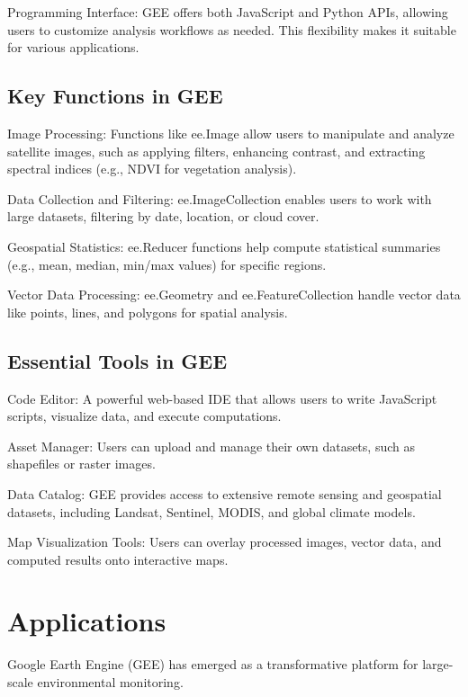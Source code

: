 \documentclass[
  letterpaper,
]{scrbook}
\begin{document}
Programming Interface: GEE offers both JavaScript and Python APIs,
allowing users to customize analysis workflows as needed. This
flexibility makes it suitable for various applications.

\subsection{Key Functions in GEE}\label{key-functions-in-gee}

Image Processing: Functions like ee.Image allow users to manipulate and
analyze satellite images, such as applying filters, enhancing contrast,
and extracting spectral indices (e.g., NDVI for vegetation analysis).

Data Collection and Filtering: ee.ImageCollection enables users to work
with large datasets, filtering by date, location, or cloud cover.

Geospatial Statistics: ee.Reducer functions help compute statistical
summaries (e.g., mean, median, min/max values) for specific regions.

Vector Data Processing: ee.Geometry and ee.FeatureCollection handle
vector data like points, lines, and polygons for spatial analysis.

\subsection{Essential Tools in GEE}\label{essential-tools-in-gee}

Code Editor: A powerful web-based IDE that allows users to write
JavaScript scripts, visualize data, and execute computations.

Asset Manager: Users can upload and manage their own datasets, such as
shapefiles or raster images.

Data Catalog: GEE provides access to extensive remote sensing and
geospatial datasets, including Landsat, Sentinel, MODIS, and global
climate models.

Map Visualization Tools: Users can overlay processed images, vector
data, and computed results onto interactive maps.

\section{Applications}\label{applications-3}

Google Earth Engine (GEE) has emerged as a transformative platform for
large-scale environmental monitoring.
\end{document}
